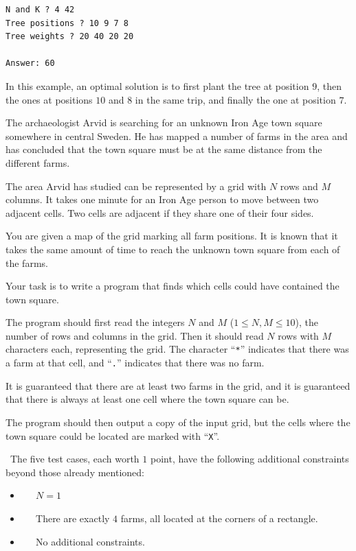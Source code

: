 \vspace{0.5cm}
\begin{verbatim}
N and K ? 4 42
Tree positions ? 10 9 7 8
Tree weights ? 20 40 20 20

Answer: 60
\end{verbatim}
 In this example, an optimal solution is to first plant the tree at position $9$, then the ones at positions $10$ and $8$ in the same trip, and finally the one at position $7$.



\newpage
{}

The archaeologist Arvid is searching for an unknown Iron Age town square somewhere in central Sweden. He has mapped
a number of farms in the area and has concluded that the town square must be at the same distance
from the different farms.

The area Arvid has studied can be represented by a grid with $N$ rows and $M$ columns. It takes one minute for an
Iron Age person to move between two adjacent cells. Two cells are adjacent if they share one of their four sides.

You are given a map of the grid marking all farm positions.
It is known that it takes the same amount of time to reach the unknown town square from each of the farms.

Your task is to write a program that finds which cells could have contained the town square.

The program should first read the integers $N$ and $M$ ($1 \leq N,M \leq 10$), the number of rows and columns in the grid.
Then it should read $N$ rows with $M$ characters each, representing the grid.
The character ``\verb|*|'' indicates that there was a farm at that cell, and ``\verb|.|'' indicates that there was no farm.

It is guaranteed that there are at least two farms in the grid,
and it is guaranteed that there is always at least one cell where the town square can be.

The program should then output a copy of the input grid, but the cells where the town square could be located are marked with ``\verb|X|''.

\vspace{0.5cm}
\
The five test cases, each worth $1$ point, have the following additional constraints beyond those already mentioned:
\begin{itemize}
\item[(1)] $\;\;\;\;$ $N = 1$
\item[(2)] $\;\;\;\;$ There are exactly $4$ farms, all located at the corners of a rectangle.
\item[(3-5)] $\;\;\;\;$ No additional constraints.
\end{itemize}

